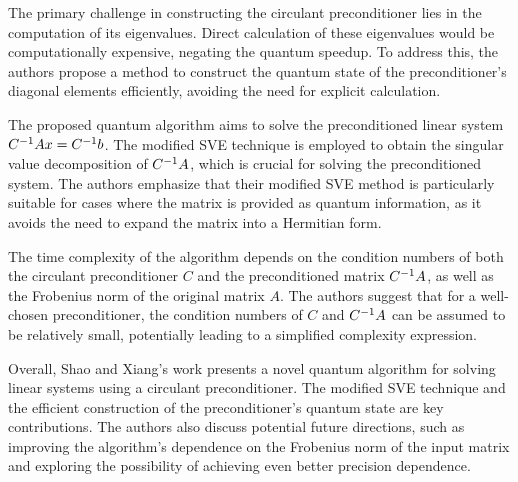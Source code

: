\documentclass[12pt]{extarticle}
\begin{document}
The primary challenge in constructing the circulant preconditioner lies in the computation of its eigenvalues.
Direct calculation of these eigenvalues would be computationally expensive, negating the quantum speedup.
To address this, the authors propose a method to construct the quantum state of the preconditioner's diagonal elements efficiently, avoiding the need for explicit calculation.

The proposed quantum algorithm aims to solve the preconditioned linear system ${{C}^{-1}}Ax={{C}^{-1}}b$.
The modified SVE technique is employed to obtain the singular value decomposition of ${{C}^{-1}}A$, which is crucial for solving the preconditioned system.
The authors emphasize that their modified SVE method is particularly suitable for cases where the matrix is provided as quantum information, as it avoids the need to expand the matrix into a Hermitian form.

The time complexity of the algorithm depends on the condition numbers of both the circulant preconditioner $C$ and the preconditioned matrix ${{C}^{-1}}A$,
as well as the Frobenius norm of the original matrix $A$.
The authors suggest that for a well-chosen preconditioner, the condition numbers of $C$ and ${{C}^{-1}}A$ can be assumed to be relatively small, potentially leading to a simplified complexity expression.

Overall, Shao and Xiang's work presents a novel quantum algorithm for solving linear systems using a circulant preconditioner.
The modified SVE technique and the efficient construction of the preconditioner's quantum state are key contributions.
The authors also discuss potential future directions, such as improving the algorithm's dependence on the Frobenius norm of the input matrix and exploring the possibility of achieving even better precision dependence.

\printbibliography
{}
\end{document}
